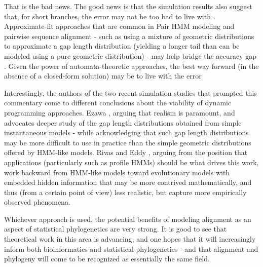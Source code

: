 \documentclass{bmcart}
\begin{document}
That is the bad news. The good news is that the simulation results also suggest that,
for short branches, the error may not be too bad to live with \cite{RivasEddy2015,Ezawa2016a}.
Approximate-fit approaches that are common in Pair HMM modeling and pairwise sequence alignment - such as using a mixture
of geometric distributions to approximate a gap length distribution (yielding a longer tail than can be modeled
using a pure geometric distribution) - may help bridge the accuracy gap \cite{DoEtAl2005}.
Given the power of automata-theoretic approaches, the best way forward
(in the absence of a closed-form solution) may be to live with the error

Interestingly, the authors of the two recent simulation studies that prompted this commentary
come to different conclusions about the viability of dynamic programming approaches.
Ezawa \cite{Ezawa2016a,Ezawa2016b}, arguing that realism is paramount, and advocates deeper study of the
gap length distributions obtained from simple instantaneous models - while acknowledging that such gap length distributions
may be more difficult to use in practice than the simple geometric distributions offered by HMM-like models.
Rivas and Eddy \cite{RivasEddy2015}, arguing from the position that applications (particularly such as profile HMMs)
should be what drives this work, work backward from HMM-like models toward evolutionary models with embedded
hidden information that may be more contrived mathematically, and thus (from a certain point of view) less realistic,
but capture more empirically observed phenomena.

Whichever approach is used, the potential benefits of modeling alignment as an aspect of
statistical phylogenetics are very strong. It is good to see that theoretical work in this area
is advancing, and one hopes that it will increasingly inform both bioinformatics and statistical phylogenetics -
and that alignment and phylogeny will come to be recognized as essentially the same field.



\end{document}
